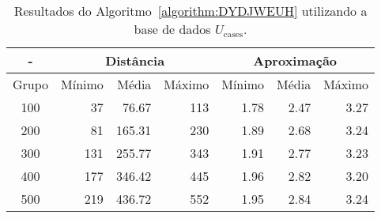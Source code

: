 \begin{table}[!htb]
  \caption{Resultados do Algoritmo~\ref{algorithm:DYDJWEUH} utilizando a base de dados $U_{\text{cases}}$.}
  \label{table:RITAXFPQ}
  \centering
  \begin{tabular}{|c|r|r|r|r|r|r|}
    \hline
      -      & \multicolumn{3}{c|}{Distância}             & \multicolumn{3}{c|}{Aproximação}           \\ \hline
    Grupo    & Mínimo       & Média        & Máximo       & Mínimo       & Média        & Máximo       \\ \hline  
    100      &  37          &  76.67       & 113          & 1.78         & 2.47         & 3.27         \\ \hline
    200      &  81          & 165.31       & 230          & 1.89         & 2.68         & 3.24         \\ \hline
    300      & 131          & 255.77       & 343          & 1.91         & 2.77         & 3.23         \\ \hline
    400      & 177          & 346.42       & 445          & 1.96         & 2.82         & 3.20         \\ \hline
    500      & 219          & 436.72       & 552          & 1.95         & 2.84         & 3.24         \\ \hline    
  \end{tabular}
\end{table}